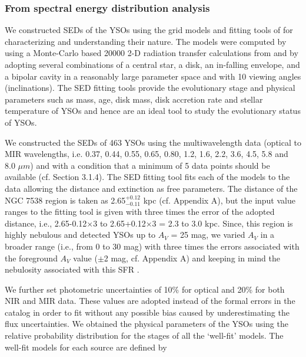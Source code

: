 \documentclass[a4paper,fleqn,usenatbib,useAMS]{mnras}
\begin{document}
\subsubsection{From spectral energy distribution analysis}

We constructed SEDs of the YSOs using the grid models and fitting tools of
\citet{2006ApJS..167..256R,2007ApJS..169..328R} for characterizing and understanding their nature. 
The models were computed by using a Monte-Carlo based 20000 2-D radiation transfer calculations 
from \citet{2003ApJ...598.1079W,2003ApJ...591.1049W, 2004ApJ...617.1177W}
and by adopting several combinations of a central star, a disk, an in-falling envelope, 
and a bipolar cavity in a reasonably large parameter space and with 10 viewing angles (inclinations). 
The SED fitting tools provide the evolutionary stage and physical parameters such as mass, age, disk mass, 
disk accretion rate and stellar temperature of YSOs and hence are an ideal tool to study the
evolutionary status of YSOs. 


We constructed the SEDs of  463 YSOs using the multiwavelength data 
(optical to MIR wavelengths, i.e. 0.37, 0.44, 0.55, 0.65, 0.80, 1.2, 1.6, 2.2, 3.6, 4.5, 5.8 and 8.0 $\mu m$) and 
with a condition that a minimum of 5 data points should be available (cf. Section 3.1.4).
The SED fitting tool fits each of the models to the data allowing the distance
and extinction as free parameters. 
The distance of the NGC 7538 region is taken as 2.65$^{+0.12}_{ -0.11}$ kpc (cf. Appendix A), but 
the input value ranges to the fitting tool is given with three times the 
error of the adopted distance, i.e., 2.65-0.12$\times$3 to 2.65+0.12$\times$3 = 2.3 to 3.0 kpc. 
Since, this region is highly nebulous and \citet[][Fig. 6]{2004ApJ...616.1042O} detected YSOs up to $A_V$ = 25 mag, 
we varied $A_V$ in a broader range (i.e., from 0 to 30 mag) with three times the
errors associated with the foreground $A_V$ value ($\pm$2 mag, cf. Appendix A) and 
keeping in mind the nebulosity associated with this SFR
\citep[see also,][]{2012ApJ...755...20S,2013MNRAS.432.3445J,2014MNRAS.443.1614P}. 

We further set photometric uncertainties of 10\% for
optical and 20\% for both NIR and MIR
data. These values are adopted instead of the formal errors
in the catalog in order to fit without any possible bias caused
by underestimating the flux uncertainties. We obtained the
physical parameters of the YSOs using the relative probability
distribution for the stages of all the `well-fit' models. The
well-fit models for each source are defined by
\end{document}

